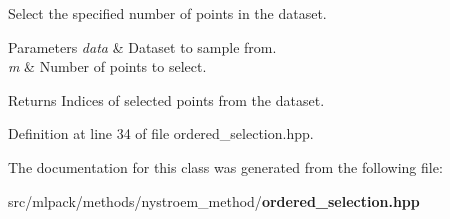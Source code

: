 Select the specified number of points in the dataset. 


\begin{DoxyParams}{Parameters}
{\em data} & Dataset to sample from. \\
\hline
{\em m} & Number of points to select. \\
\hline
\end{DoxyParams}
\begin{DoxyReturn}{Returns}
Indices of selected points from the dataset. 
\end{DoxyReturn}


Definition at line 34 of file ordered\-\_\-selection.\-hpp.



The documentation for this class was generated from the following file\-:\begin{DoxyCompactItemize}
\item 
src/mlpack/methods/nystroem\-\_\-method/{\bf ordered\-\_\-selection.\-hpp}\end{DoxyCompactItemize}
